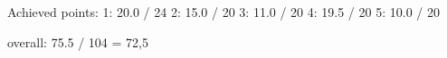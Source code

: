 Achieved points:
1: 20.0 / 24
2: 15.0 / 20
3: 11.0 / 20
4: 19.5 / 20
5: 10.0 / 20

overall: 75.5 / 104 = 72,5%


